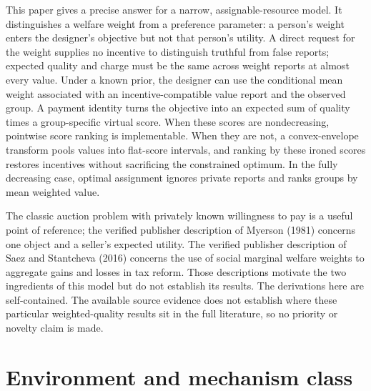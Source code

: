 \documentclass[11pt]{article}
\begin{document}
This paper gives a precise answer for a narrow, assignable-resource model. It distinguishes a welfare weight from a preference parameter: a person's weight enters the designer's objective but not that person's utility. A direct request for the weight supplies no incentive to distinguish truthful from false reports; expected quality and charge must be the same across weight reports at almost every value. Under a known prior, the designer can use the conditional mean weight associated with an incentive-compatible value report and the observed group. A payment identity turns the objective into an expected sum of quality times a group-specific virtual score. When these scores are nondecreasing, pointwise score ranking is implementable. When they are not, a convex-envelope transform pools values into flat-score intervals, and ranking by these ironed scores restores incentives without sacrificing the constrained optimum. In the fully decreasing case, optimal assignment ignores private reports and ranks groups by mean weighted value.

The classic auction problem with privately known willingness to pay is a useful point of reference; the verified publisher description of Myerson (1981) concerns one object and a seller's expected utility. The verified publisher description of Saez and Stantcheva (2016) concerns the use of social marginal welfare weights to aggregate gains and losses in tax reform. Those descriptions motivate the two ingredients of this model but do not establish its results. The derivations here are self-contained. The available source evidence does not establish where these particular weighted-quality results sit in the full literature, so no priority or novelty claim is made.

\section{Environment and mechanism class}\label{sec:model}
\end{document}
